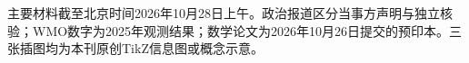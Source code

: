 \documentclass[11pt]{article}
\begin{document}
\begin{documents}
\par{}\par
{\scriptsize 主要材料截至北京时间2026年10月28日上午。政治报道区分当事方声明与独立核验；WMO数字为2025年观测结果；数学论文为2026年10月26日提交的预印本。三张插图均为本刊原创TikZ信息图或概念示意。}\par
\begingroup\fontsize{6}{7.1}\selectfont
\renewcommand{\refname}{参考文献}

\endgroup
\end{documents}
\end{document}
